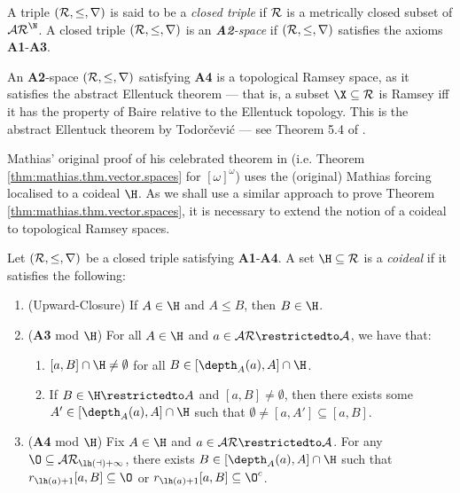 \documentclass[11pt,reqno]{amsart}
\begin{document}
\begin{definition}
    A triple $(\cal{R},\leq,r)$ is said to be a \emph{closed triple} if $\cal{R}$ is a metrically closed subset of $\cal{AR}^\N$. A closed triple $(\cal{R},\leq,r)$ is an \emph{\textbf{A2}-space} if $(\cal{R},\leq,r)$ satisfies the axioms \textbf{A1}-\textbf{A3}.
\end{definition}

An \textbf{A2}-space $(\cal{R},\leq,r)$ satisfying \textbf{A4} is a topological Ramsey space, as it satisfies the abstract Ellentuck theorem --- that is, a subset $\X \subseteq \cal{R}$ is Ramsey iff it has the property of Baire relative to the Ellentuck topology. This is the abstract Ellentuck theorem by Todor\v{c}evi\'{c} --- see Theorem 5.4 of \cite{T10}.

Mathias' original proof of his celebrated theorem in \cite{M77} (i.e. Theorem \ref{thm:mathias.thm.vector.spaces} for $[\omega]^\omega$) uses the (original) Mathias forcing localised to a coideal $\H$. As we shall use a similar approach to prove Theorem \ref{thm:mathias.thm.vector.spaces}, it is necessary to extend the notion of a coideal to topological Ramsey spaces. 

\begin{definition}
\label{def:coideal}
    Let $(\cal{R},\leq,r)$ be a closed triple satisfying \textbf{A1}-\textbf{A4}. A set $\H \subseteq \cal{R}$ is a \emph{coideal} if it satisfies the following:
    \begin{enumerate}
        \item (Upward-Closure) If $A \in \H$ and $A \leq B$, then $B \in \H$.
        
        \item (\textbf{A3} mod $\H$) For all $A \in \H$ and $a \in \cal{AR}\restrictedto A$, we have that:
        \begin{enumerate}
            \item $[a,B] \cap \H \neq \emptyset$ for all $B \in [\depth_A(a),A] \cap \H$.
            
            \item If $B \in \H \restrictedto A$ and $[a,B] \neq \emptyset$, then there exists some $A' \in [\depth_A(a),A] \cap \H$ such that $\emptyset \neq [a,A'] \subseteq [a,B]$.
        \end{enumerate}
        
        \item (\textbf{A4} mod $\H$) Fix $A \in \H$ and $a \in \cal{AR} \restrictedto A$. For any $\O \subseteq \cal{AR}_{\lh(a)+1}$, there exists $B \in [\depth_A(a),A] \cap \H$ such that $r_{\lh(a)+1}[a,B] \subseteq \O$ or $r_{\lh(a)+1}[a,B] \subseteq \O^c$.
    \end{enumerate}
\end{definition}
\end{document}
